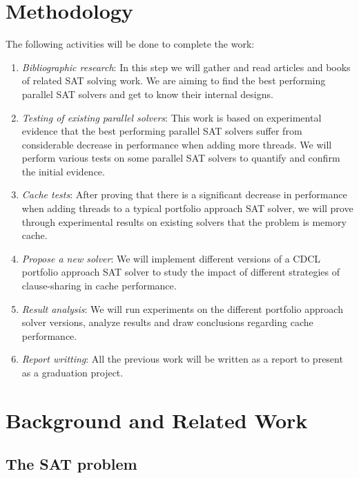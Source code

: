 \documentclass[12pt]{diicc}
\begin{document}
\chapter{Methodology}\label{chap:methodology}
The following activities will be done to complete the work:
\begin{enumerate}
\item \textit{Bibliographic research}: In this step we will gather and read articles and books of related SAT solving work. We are aiming to find the best performing parallel SAT solvers and get to know their internal designs.
\item \textit{Testing of existing parallel solvers}: This work is based on experimental evidence that the best performing parallel SAT solvers suffer from considerable decrease in performance when adding more threads. We will perform various tests on some parallel SAT solvers to quantify and confirm the initial evidence.
\item \textit{Cache tests}: After proving that there is a significant decrease in performance when adding threads to a typical portfolio approach SAT solver, we will prove through experimental results on existing solvers that the problem is memory cache.
\item \textit{Propose a new solver}: We will implement different versions of a CDCL portfolio approach SAT solver to study the impact of different strategies of clause-sharing in cache performance.
\item \textit{Result analysis}: We will run experiments on the different portfolio approach solver versions, analyze results and draw conclusions regarding cache performance.
\item \textit{Report writting}: All the previous work will be written as a report to present as a graduation project.
\end{enumerate}


%
% 
\chapter{Background and Related Work}\label{chap:background}

\section{The SAT problem}
\end{document}

